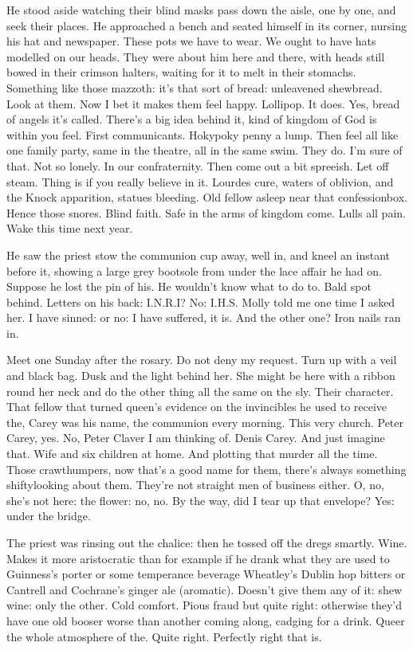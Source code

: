 He stood aside
watching their blind masks pass down the aisle,
one by one,
and seek their places.
He approached a bench and seated himself in its corner,
nursing his hat and newspaper.
These pots we have to wear.
We ought to have hats modelled on our heads.
They were about him here and there,
with heads still bowed in their crimson halters,
waiting for it to melt in their stomachs.
Something like those mazzoth:
it's that sort of bread:
unleavened shewbread.
Look at them.
Now I bet it makes them feel happy.
Lollipop.
It does.
Yes, bread of angels it's called.
There's a big idea behind it,
kind of kingdom of God is within you feel.
First communicants.
Hokypoky penny a lump.
Then feel all like one family party,
same in the theatre, all in the same swim.
They do.
I'm sure of that.
Not so lonely.
In our confraternity.
Then come out a bit spreeish.
Let off steam.
Thing is if you really believe in it.
Lourdes cure,
waters of oblivion,
and the Knock apparition,
statues bleeding.
Old fellow asleep near that confessionbox.
Hence those snores.
Blind faith.
Safe in the arms of kingdom come.
Lulls all pain.
Wake this time next year.

He saw the priest stow the communion cup away,
well in,
and kneel an instant before it,
showing a large grey bootsole from under the lace affair he had on.
Suppose he lost the pin of his.
He wouldn't know what to do to.
Bald spot behind.
Letters on his back:
I.N.R.I?
No:
I.H.S.
Molly told me one time I asked her.
I have sinned:
or no:
I have suffered, it is.
And the other one?
Iron nails ran in.

Meet one Sunday after the rosary.
Do not deny my request.
Turn up with a veil and black bag.
Dusk and the light behind her.
She might be here with a ribbon round her neck
and do the other thing all the same on the sly.
Their character.
That fellow that turned queen's evidence on the invincibles
he used to receive the,
Carey was his name,
the communion every morning.
This very church.
Peter Carey, yes.
No, Peter Claver I am
thinking of.
Denis Carey.
And just imagine that.
Wife and six children at home.
And plotting that murder all the time.
Those crawthumpers,
now that's a good name for them,
there's always something shiftylooking about them.
They're not straight men of business either.
O, no, she's not here:
the flower:
no, no.
By the way, did I tear up that envelope?
Yes: under the bridge.

The priest was rinsing out the chalice:
then he tossed off the dregs smartly.
Wine.
Makes it more aristocratic than
for example if he drank
what they are used to
Guinness's porter or some temperance beverage
Wheatley's Dublin hop bitters
or Cantrell and Cochrane's ginger ale (aromatic).
Doesn't give them any of it:
shew wine:
only the other.
Cold comfort.
Pious fraud but quite right:
otherwise they'd have one old booser worse than another coming along,
cadging for a drink.
Queer the whole atmosphere of the.
Quite right.
Perfectly right that is.

